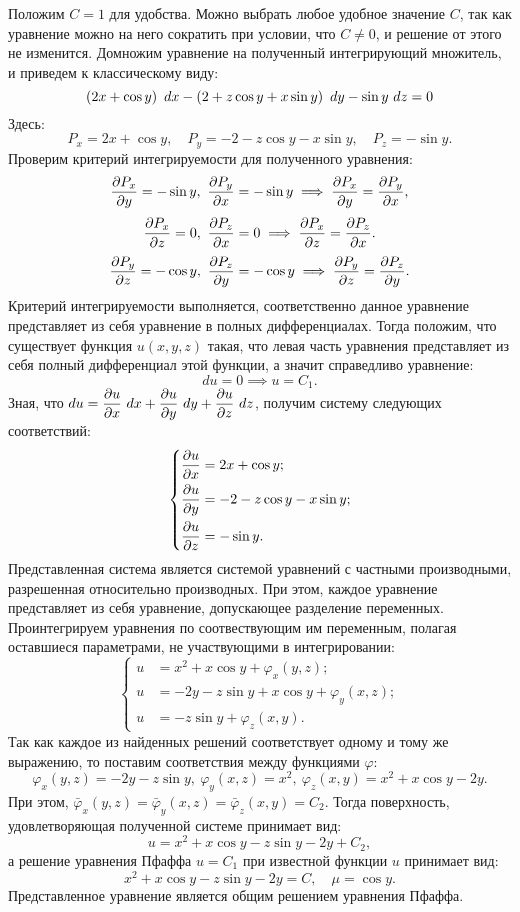 		Положим $C = 1$ для удобства. Можно выбрать любое удобное значение $C$, так как уравнение можно на него сократить при условии, что $C \neq 0$, и решение от этого не изменится. Домножим уравнение на полученный интегрирующий множитель, и приведем к классическому виду:
		\[ \left( 2x + \cos{y} \right) ~ dx - \left( 2 + z \cos{y} + x \sin{y} \right) ~ dy - \sin{y} ~ dz = 0 \] %
		Здесь:
		\[ P_x = 2x + \cos{y}, \quad P_y = -2 - z \cos{y} - x \sin{y}, \quad P_z = -\sin{y}. \]
		Проверим критерий интегрируемости для полученного уравнения:
		\[ \dfrac{\partial P_x}{\partial y} = -\sin{y}, ~ \dfrac{\partial P_y}{\partial x} = -\sin{y} \implies \dfrac{\partial P_x}{\partial y} = \dfrac{\partial P_y}{\partial x}, \]
		\[ \dfrac{\partial P_x}{\partial z} = 0, ~ \dfrac{\partial P_z}{\partial x} = 0 \implies \dfrac{\partial P_x}{\partial z} = \dfrac{\partial P_z}{\partial x}. \]
		\[ \dfrac{\partial P_y}{\partial z} = - \cos{y}, ~ \dfrac{\partial P_z}{\partial y} = - \cos{y} \implies \dfrac{\partial P_y}{\partial z} = \dfrac{\partial P_z}{\partial y}. \]
		Критерий интегрируемости выполняется, соответственно данное уравнение представляет из себя уравнение в полных дифференциалах. Тогда положим, что существует функция $u(x, y, z)$ такая, что левая часть уравнения представляет из себя полный дифференциал этой функции, а значит справедливо уравнение:
		\[ du = 0 \implies u = C_1. \]
		Зная, что \( \displaystyle du = \dfrac{\partial u}{\partial x} ~ dx + \dfrac{\partial u}{\partial y} ~ dy + \dfrac{\partial u}{\partial z} ~ dz \), получим систему следующих соответствий:
		\[ \left\lbrace \begin{split} 
			\dfrac{\partial u}{\partial x} &= 2x + \cos{y}; \\
			\dfrac{\partial u}{\partial y} &= - 2 - z \cos{y} - x \sin{y}; \\
			\dfrac{\partial u}{\partial z} &= -\sin{y}.
		\end{split} \right. \]
		Представленная система является системой уравнений с частными производными, разрешенная относительно производных. При этом, каждое уравнение представляет из себя уравнение, допускающее разделение переменных. Проинтегрируем уравнения по соотвествующим им переменным, полагая оставшиеся параметрами, не участвующими в интегрировании:
		\[ \left\lbrace \begin{split} 
			u &= x^2 + x \cos{y} + \varphi_x(y, z); \\
			u &= -2y - z \sin{y} + x \cos{y} + \varphi_y(x, z); \\
			u &= - z \sin{y} + \varphi_z(x, y).
		\end{split} \right. \]
		Так как каждое из найденных решений соответствует одному и тому же выражению, то поставим соответствия между функциями $\varphi$:
		\[ \varphi_x(y, z) = - 2y - z \sin{y}, ~ \varphi_y(x, z) = x^2, ~ \varphi_z(x, y) = x^2 + x \cos{y} - 2y. \]
		При этом, $\bar{\varphi}_x(y, z) = \bar{\varphi}_y(x, z) = \bar{\varphi}_z(x, y) = C_2$. Тогда поверхность, удовлетворяющая полученной системе принимает вид:
		\[ u = x^2 + x\cos{y} - z \sin{y} - 2y + C_2, \]
		а решение уравнения Пфаффа $u = C_1$ при известной функции $u$ принимает вид:
		\[ x^2 + x\cos{y} - z \sin{y} - 2y = C, \quad \mu = \cos{y}. \]
		Представленное уравнение является общим решением уравнения Пфаффа.

